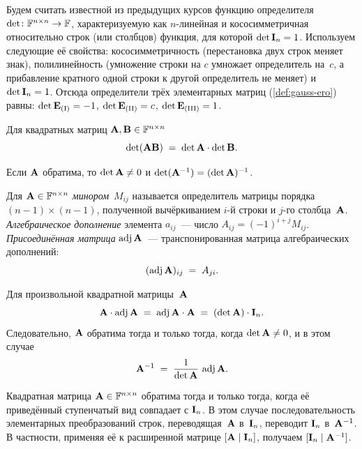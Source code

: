 Будем считать известной из предыдущих курсов функцию определителя
$\det\colon \mathbb{F}^{n \times n} \to \mathbb{F}$, характеризуемую как
$n$-линейная и кососимметричная относительно строк (или столбцов)
функция, для которой $\det \mathbf{I}_n = 1$. Используем следующие её
свойства: кососимметричность (перестановка двух строк меняет знак),
полилинейность (умножение строки на $c$ умножает определитель
на~$c$, а прибавление кратного одной строки к другой определитель не
меняет) и $\det \mathbf{I}_n = 1$. Отсюда определители трёх элементарных
матриц (\cref{def:gauss-ero}) равны:
$\det \mathbf{E}_{\text{(I)}} = -1$, $\det \mathbf{E}_{\text{(II)}} = c$,
$\det \mathbf{E}_{\text{(III)}} = 1$.

\begin{theorem}
\label{thm:det-product}
Для квадратных матриц $\mathbf{A}, \mathbf{B} \in \mathbb{F}^{n \times n}$
\[
  \det(\mathbf{A}\mathbf{B}) \;=\; \det \mathbf{A} \cdot \det \mathbf{B}.
\]
\end{theorem}

\begin{corollary}
\label{cor:det-inverse}
Если $\mathbf{A}$ обратима, то $\det \mathbf{A} \neq 0$ и
$\det(\mathbf{A}^{-1}) = (\det \mathbf{A})^{-1}$.
\end{corollary}

\begin{definition}
\label{def:adjugate}
Для $\mathbf{A} \in \mathbb{F}^{n \times n}$ \emph{минором}~$M_{ij}$ называется
определитель матрицы порядка $(n-1) \times (n-1)$, полученной
вычёркиванием $i$-й строки и $j$-го столбца~$\mathbf{A}$.
\emph{Алгебраическое дополнение} элемента $a_{ij}$~--- число
$A_{ij} = (-1)^{i+j} M_{ij}$. \emph{Присоединённая матрица}
$\operatorname{adj} \mathbf{A}$~--- транспонированная матрица алгебраических дополнений:
\[
  (\operatorname{adj} \mathbf{A})_{ij} \;=\; A_{ji}.
\]
\end{definition}

\begin{theorem}
\label{thm:cofactor-inverse}
Для произвольной квадратной матрицы~$\mathbf{A}$
\[
  \mathbf{A} \cdot \operatorname{adj} \mathbf{A} \;=\; \operatorname{adj} \mathbf{A} \cdot \mathbf{A}
  \;=\; (\det \mathbf{A}) \cdot \mathbf{I}_n.
\]
Следовательно, $\mathbf{A}$ обратима тогда и только тогда, когда
$\det \mathbf{A} \neq 0$, и в этом случае
\[
  \mathbf{A}^{-1} \;=\; \frac{1}{\det \mathbf{A}}\,\operatorname{adj} \mathbf{A}.
\]
\end{theorem}

\begin{theorem}
\label{thm:ero-inverse}
Квадратная матрица $\mathbf{A} \in \mathbb{F}^{n \times n}$ обратима тогда и
только тогда, когда её приведённый ступенчатый вид совпадает с
$\mathbf{I}_n$. В этом случае последовательность элементарных
преобразований строк, переводящая~$\mathbf{A}$ в~$\mathbf{I}_n$, переводит
$\mathbf{I}_n$ в~$\mathbf{A}^{-1}$. В частности, применяя её к расширенной
матрице $[\mathbf{A} \mid \mathbf{I}_n]$, получаем
$[\mathbf{I}_n \mid \mathbf{A}^{-1}]$.
\end{theorem}

